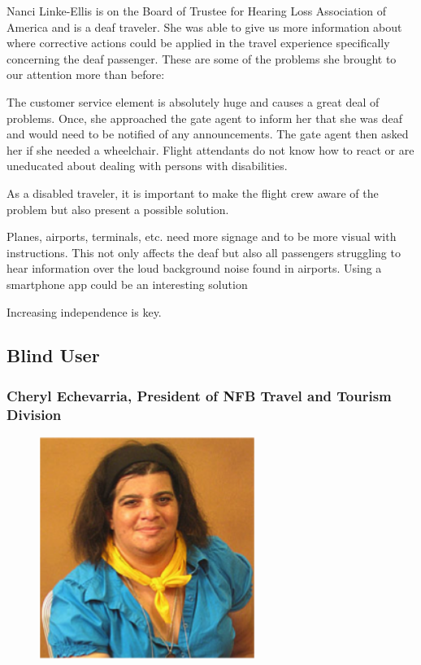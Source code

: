 Nanci Linke-Ellis is on the Board of Trustee for Hearing Loss Association of America and is a deaf traveler. She was able to give us more information about where corrective actions could be applied in the travel experience specifically concerning the deaf passenger. These are some of the problems she brought to our attention more than before:

\begin{list}{-}{}
  \item The customer service element is absolutely huge and causes a great deal of problems. Once, she approached the gate agent to inform her that she was deaf and would need to be notified of any announcements. The gate agent then asked her if she needed a wheelchair. Flight attendants do not know how to react or are uneducated about dealing with persons with disabilities. 
  \item As a disabled traveler, it is important to make the flight crew aware of the problem but also present a possible solution. 
  \item Planes, airports, terminals, etc. need more signage and to be more visual with instructions. This not only affects the deaf but also all passengers struggling to hear information over the loud background noise found in airports. Using a smartphone app could be an interesting solution
  \item Increasing independence is key. 
\end{list}

\subsection*{Blind User}
\subsubsection{Cheryl Echevarria, President of NFB Travel and Tourism Division}
\begin{figure}[h]
  \centering
     \includegraphics[width=7cm]{images/image028}
  \label{fig:28}
\end{figure}


